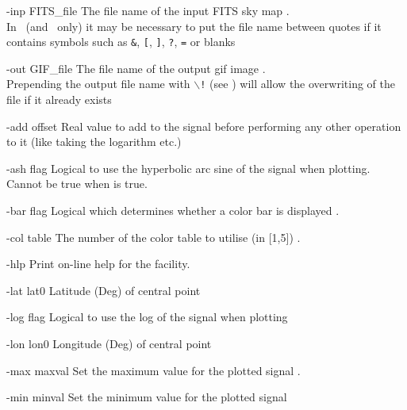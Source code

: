 \begin{qualifiers}
  \begin{qulist}{} %
%
    \item[{-inp FITS\_file}] 
The file name of the input FITS sky map \nodefault.\\
In \thedocid\ (and \thedocid\ only) it may be necessary to put the file name between quotes if it contains symbols
such as \texttt{\&}, \texttt{[}, \texttt{]}, \texttt{?}, \texttt{=}  or blanks
%
    \item[{-out GIF\_file}] 
The file name of the output gif image \nodefault.\\
Prepending the output file name with \texttt{$\backslash$!} 
(see ) will allow the overwriting of the
file if it already exists
%
    \item[{-add offset}] 
Real value to add to the signal before performing any
      other operation to it (like taking the logarithm etc.)
%
    \item[{-ash flag}] 
Logical to use the hyperbolic arc sine of the signal when
      plotting. Cannot be true when  is true.
%
    \item[{-bar flag}]
 Logical which determines whether a color bar is
      displayed . 
%
    \item[{-col table}] 
The number of the color table to utilise (in [1,5]) .
%
    \item[{-hlp}]
 Print on-line help for the facility.
%
    \item[{-lat lat0}]
 Latitude (Deg) of central point 
%
    \item[{-log flag}]
 Logical to use the log of the signal when plotting 
%
    \item[{-lon lon0}]
 Longitude (Deg) of central point 
%
    \item[{-max maxval}]
 Set the maximum value for the plotted signal
      .
%
    \item[{-min minval}]
 Set the minimum value for the plotted signal

\end{qulist}
\end{qualifiers}
